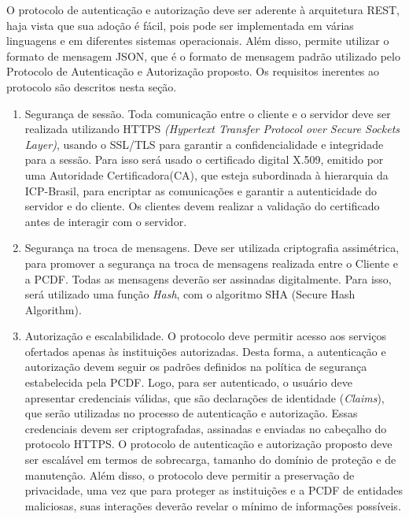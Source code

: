 O protocolo de autenticação e autorização deve ser aderente à arquitetura REST, haja vista que sua adoção é fácil, pois pode ser implementada em várias linguagens e em diferentes sistemas operacionais.  Além disso, permite utilizar o formato de mensagem JSON, que é o formato de mensagem padrão utilizado pelo Protocolo de Autenticação e Autorização proposto. Os requisitos inerentes ao protocolo são descritos nesta seção.

\begin{enumerate}[RQ1]

\item Segurança de sessão. Toda comunicação entre o cliente e o servidor deve ser realizada utilizando HTTPS
\emph{(Hypertext Transfer Protocol over Secure Sockets Layer)}, usando o SSL/TLS para garantir a confidencialidade
e integridade para a sessão. Para isso será usado o certificado digital X.509, emitido por uma Autoridade Certificadora(CA), que esteja subordinada à hierarquia da ICP-Brasil, para encriptar as comunicações e garantir a autenticidade do servidor e do cliente. Os clientes devem realizar a validação do certificado antes de interagir com o servidor.

\item Segurança na troca de mensagens. Deve ser utilizada criptografia assimétrica, para promover a segurança na troca de mensagens realizada entre o Cliente e a PCDF. Todas as mensagens deverão ser assinadas digitalmente. Para isso, será utilizado uma função \emph{Hash}, com o algoritmo SHA (Secure Hash Algorithm).

\item Autorização e escalabilidade. O protocolo deve permitir acesso aos serviços ofertados apenas às instituições autorizadas. Desta forma, a autenticação e autorização devem seguir os padrões definidos na política de segurança estabelecida pela PCDF. Logo, para ser autenticado, o usuário deve apresentar credenciais válidas, que são declarações de identidade (\emph{Claims}), que serão utilizadas no processo de autenticação e autorização. Essas credenciais devem ser criptografadas, assinadas e enviadas no cabeçalho do protocolo HTTPS.
    O protocolo de autenticação e autorização proposto deve ser escalável em termos de sobrecarga, tamanho do domínio de proteção e de manutenção. Além disso, o protocolo deve permitir a preservação de privacidade, uma vez que para proteger as instituições e a PCDF de entidades maliciosas, suas interações deverão revelar o mínimo de informações possíveis.


\end{enumerate}

